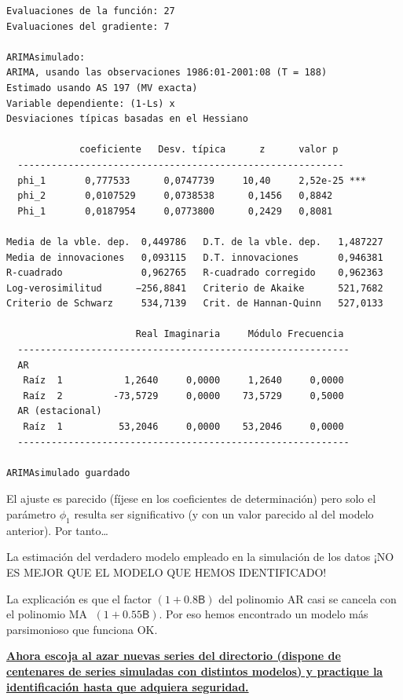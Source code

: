 \documentclass[10pt]{article}
\begin{document}
\begin{verbatim}
Evaluaciones de la función: 27
Evaluaciones del gradiente: 7

ARIMAsimulado:
ARIMA, usando las observaciones 1986:01-2001:08 (T = 188)
Estimado usando AS 197 (MV exacta)
Variable dependiente: (1-Ls) x
Desviaciones típicas basadas en el Hessiano

             coeficiente   Desv. típica      z      valor p 
  ----------------------------------------------------------
  phi_1       0,777533      0,0747739     10,40     2,52e-25 ***
  phi_2       0,0107529     0,0738538      0,1456   0,8842  
  Phi_1       0,0187954     0,0773800      0,2429   0,8081  

Media de la vble. dep.  0,449786   D.T. de la vble. dep.   1,487227
Media de innovaciones   0,093115   D.T. innovaciones       0,946381
R-cuadrado              0,962765   R-cuadrado corregido    0,962363
Log-verosimilitud      −256,8841   Criterio de Akaike      521,7682
Criterio de Schwarz     534,7139   Crit. de Hannan-Quinn   527,0133

                       Real Imaginaria     Módulo Frecuencia
  -----------------------------------------------------------
  AR
   Raíz  1           1,2640     0,0000     1,2640     0,0000
   Raíz  2         -73,5729     0,0000    73,5729     0,5000
  AR (estacional)
   Raíz  1          53,2046     0,0000    53,2046     0,0000
  -----------------------------------------------------------

ARIMAsimulado guardado
\end{verbatim}

El ajuste es parecido (fíjese en los coeficientes de determinación)
pero solo el parámetro \(\phi_1\) resulta ser significativo (y con un
valor parecido al del modelo anterior). Por tanto\ldots{}
\bigskip

La estimación del verdadero modelo empleado en la simulación de los
datos ¡NO ES MEJOR QUE EL MODELO QUE HEMOS IDENTIFICADO!

La explicación es que el factor \((1 + 0.8\mathsf{B})\) del polinomio AR
casi se cancela con el polinomio MA \(\;(1 + 0.55\mathsf{B})\). Por eso hemos encontrado un modelo más parsimonioso que funciona OK.
\bigskip


\textbf{\uline{Ahora escoja al azar nuevas series del \href{https://github.com/mbujosab/EconometriaAplicada-SRC/tree/main/Ejercicios/IdentificaEstosARIMA}{directorio} (dispone de
 centenares de series simuladas con distintos modelos) y practique la
 identificación hasta que adquiera seguridad.}}
\end{document}
